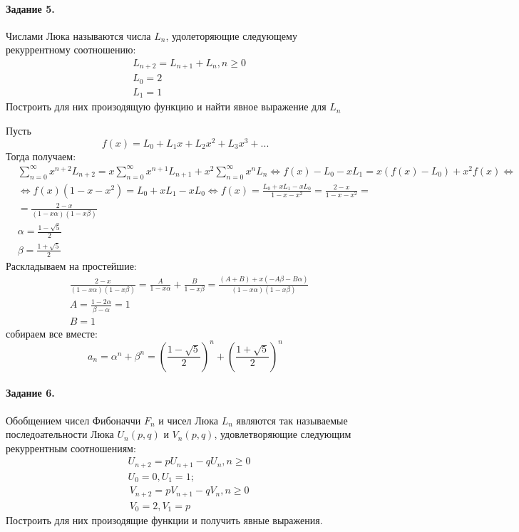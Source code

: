 \documentclass[a4paper,12pt]{article}
\begin{document}
\paragraph{Задание 5.} Числами Люка называются числа $L_n$, удолеторяющие следующему рекуррентному соотношению:
\[
	\begin{split}
		& L_{n+2} = L_{n+1} + L_n, n \ge 0 \\
		& L_0 = 2 \\
		& L_1 = 1
	\end{split}
\]
Построить для них произодящую функцию и найти явное выражение для $L_n$
\begin{Solution}

Пусть
\[
	f\left(x\right) = L_0 + L_1 x + L_2 x^2 + L_3 x^3 + ...
\]
Тогда получаем:
\[
	\begin{split}
		& \sum_{n=0}^{\infty} x^{n+2} L_{n+2} = x\sum_{n=0}^{\infty} x^{n+1} L_{n+1} + x^2\sum_{n=0}^{\infty} x^n L_n \Leftrightarrow f\left(x\right) - L_0 - x L_1 = x\left(f\left(x\right) - L_0\right) + x^2 f\left(x\right) \Leftrightarrow \\
		& \Leftrightarrow f\left(x\right) \left(1-x-x^2\right) = L_0 + x L_1 - x L_0 \Leftrightarrow f\left(x\right) = \frac{L_0 + x L_1 - x L_0}{1-x-x^2} = \frac{2-x}{1-x-x^2} = \\
		& = \frac{2-x}{\left(1-x\alpha\right)\left(1-x\beta\right)} \\
		& \alpha = \frac{1-\sqrt{5}}{2} \\
		& \beta = \frac{1+\sqrt{5}}{2}
	\end{split}
\]
Раскладываем на простейшие:
\[
	\begin{split}
		& \frac{2-x}{\left(1-x\alpha\right)\left(1-x\beta\right)} = \frac{A}{1-x\alpha} + \frac{B}{1-x\beta} = \frac{\left(A+B\right) + x\left(-A\beta - B\alpha\right)}{\left(1-x\alpha\right)\left(1-x\beta\right)} \\
		& A = \frac{1-2\alpha}{\beta-\alpha} = 1 \\
		& B = 1
	\end{split}
\]
собираем все вместе:
\[
	a_n = {\alpha}^n + {\beta}^n = {\left(\frac{1-\sqrt{5}}{2}\right)}^n + {\left(\frac{1+\sqrt{5}}{2}\right)}^n
\]
\end{Solution}

\paragraph{Задание 6.} Обобщением чисел Фибоначчи $F_n$ и чисел Люка $L_n$ являются так называемые последоательности Люка $U_n \left(p,q\right)$ и $V_n \left(p,q\right)$, удовлетворяющие следующим рекуррентным соотношениям:
\[
	\begin{split}
		& U_{n+2} = p U_{n+1} - q U_n, n \ge 0 \\
		& U_0 = 0, U_1 = 1;
	\end{split}
\]
\[
	\begin{split}
		& V_{n+2} = p V_{n+1} - q V_n, n \ge 0 \\
		& V_0 = 2, V_1 = p
	\end{split}
\]
Построить для них произодящие функции и получить явные выражения.
\end{document}
